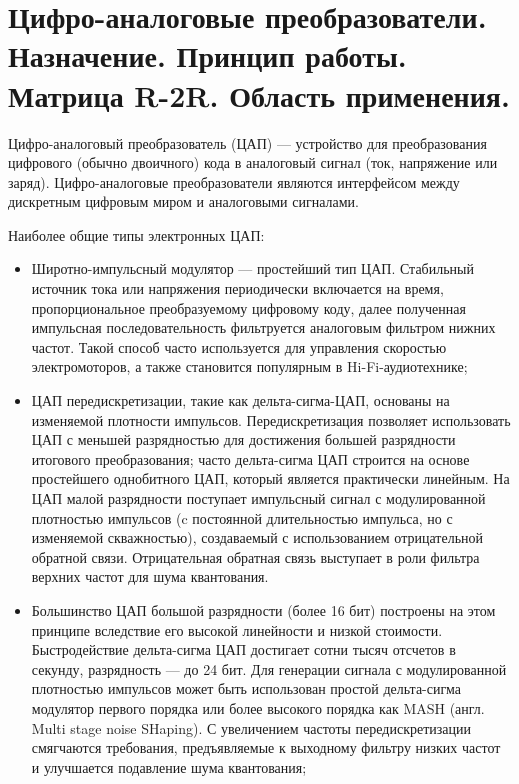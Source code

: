 \documentclass[unicode, 12pt, a4paper, oneside]{article}
\begin{document}
\section{Цифро-аналоговые преобразователи. Назначение. Принцип работы. Матрица R-2R. Область применения.}

Цифро-аналоговый преобразователь (ЦАП) — устройство для преобразования цифрового (обычно двоичного) кода в аналоговый сигнал (ток, напряжение или заряд). Цифро-аналоговые преобразователи являются интерфейсом между дискретным цифровым миром и аналоговыми сигналами.

Наиболее общие типы электронных ЦАП:

\begin{itemize}
\item Широтно-импульсный модулятор — простейший тип ЦАП. Стабильный источник тока или напряжения периодически включается на время, пропорциональное преобразуемому цифровому коду, далее полученная импульсная последовательность фильтруется аналоговым фильтром нижних частот. Такой способ часто используется для управления скоростью электромоторов, а также становится популярным в Hi-Fi-аудиотехнике;

\item ЦАП передискретизации, такие как дельта-сигма-ЦАП, основаны на изменяемой плотности импульсов. Передискретизация позволяет использовать ЦАП с меньшей разрядностью для достижения большей разрядности итогового преобразования; часто дельта-сигма ЦАП строится на основе простейшего однобитного ЦАП, который является практически линейным. На ЦАП малой разрядности поступает импульсный сигнал с модулированной плотностью импульсов (c постоянной длительностью импульса, но с изменяемой скважностью), создаваемый с использованием отрицательной обратной связи. Отрицательная обратная связь выступает в роли фильтра верхних частот для шума квантования.

\item Большинство ЦАП большой разрядности (более 16 бит) построены на этом принципе вследствие его высокой линейности и низкой стоимости. Быстродействие дельта-сигма ЦАП достигает сотни тысяч отсчетов в секунду, разрядность — до 24 бит. Для генерации сигнала с модулированной плотностью импульсов может быть использован простой дельта-сигма модулятор первого порядка или более высокого порядка как MASH (англ. Multi stage noise SHaping). С увеличением частоты передискретизации смягчаются требования, предъявляемые к выходному фильтру низких частот и улучшается подавление шума квантования;


\end{itemize}
\end{document}
